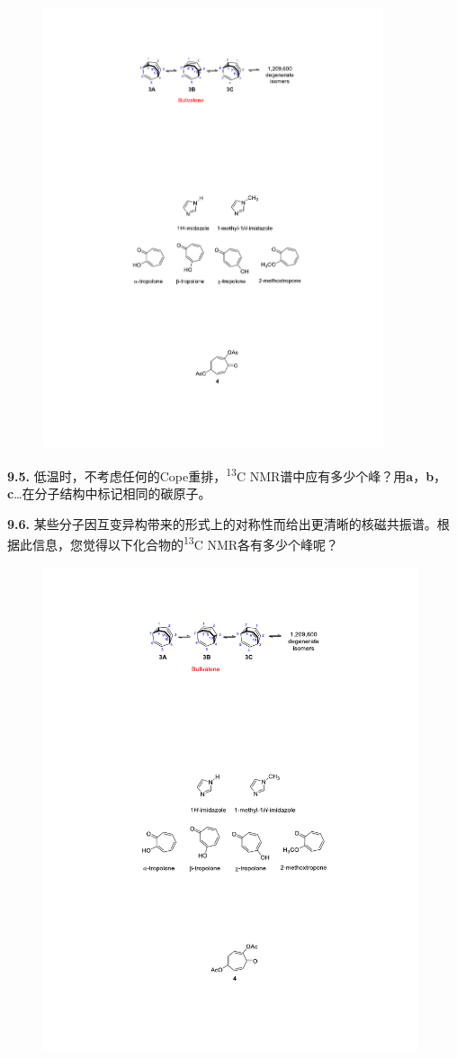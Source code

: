 \begin{figure}[h]
	\centering
	\includegraphics[width=10cm]{./pic/t9-2.pdf}
\end{figure}

\noindent\textbf{9.5.} 低温时，不考虑任何的Cope重排，\textsuperscript{13}C
NMR谱中应有多少个峰？用\textbf{a}，\textbf{b}，\textbf{c}\ldots{}在分子结构中标记相同的碳原子。

\noindent\textbf{9.6.}
某些分子因互变异构带来的形式上的对称性而给出更清晰的核磁共振谱。根据此信息，您觉得以下化合物的\textsuperscript{13}C
NMR各有多少个峰呢？

\begin{figure}[h]
	\centering
	\includegraphics[width=11cm]{./pic/t9-3.pdf}
\end{figure}

